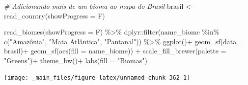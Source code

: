 \documentclass[
  brazilian,
]{book}
\newenvironment{Shaded}{\begin{snugshade}}{\end{snugshade}}
\newcommand{\AttributeTok}[1]{\textcolor[rgb]{0.77,0.63,0.00}{#1}}
\newcommand{\CommentTok}[1]{\textcolor[rgb]{0.56,0.35,0.01}{\textit{#1}}}
\newcommand{\FunctionTok}[1]{\textcolor[rgb]{0.00,0.00,0.00}{#1}}
\newcommand{\NormalTok}[1]{#1}
\newcommand{\OtherTok}[1]{\textcolor[rgb]{0.56,0.35,0.01}{#1}}
\newcommand{\SpecialCharTok}[1]{\textcolor[rgb]{0.00,0.00,0.00}{#1}}
\newcommand{\StringTok}[1]{\textcolor[rgb]{0.31,0.60,0.02}{#1}}
\begin{document}
\begin{Shaded}
\begin{Highlighting}[]
\CommentTok{\# Adicionando mais de um bioma ao mapa do Brasil}
\NormalTok{brasil }\OtherTok{\textless{}{-}} \FunctionTok{read\_country}\NormalTok{(}\AttributeTok{showProgress =}\NormalTok{ F)}

\FunctionTok{read\_biomes}\NormalTok{(}\AttributeTok{showProgress =}\NormalTok{ F) }\SpecialCharTok{\%\textgreater{}\%} 
\NormalTok{  dplyr}\SpecialCharTok{::}\FunctionTok{filter}\NormalTok{(name\_biome }\SpecialCharTok{\%in\%} \FunctionTok{c}\NormalTok{(}\StringTok{"Amazônia"}\NormalTok{, }\StringTok{"Mata Atlântica"}\NormalTok{, }\StringTok{"Pantanal"}\NormalTok{)) }\SpecialCharTok{\%\textgreater{}\%}
  \FunctionTok{ggplot}\NormalTok{()}\SpecialCharTok{+}
  \FunctionTok{geom\_sf}\NormalTok{(}\AttributeTok{data =}\NormalTok{ brasil)}\SpecialCharTok{+}
  \FunctionTok{geom\_sf}\NormalTok{(}\FunctionTok{aes}\NormalTok{(}\AttributeTok{fill =}\NormalTok{ name\_biome)) }\SpecialCharTok{+}
  \FunctionTok{scale\_fill\_brewer}\NormalTok{(}\AttributeTok{palette =} \StringTok{"Greens"}\NormalTok{)}\SpecialCharTok{+}
  \FunctionTok{theme\_bw}\NormalTok{()}\SpecialCharTok{+}
  \FunctionTok{labs}\NormalTok{(}\AttributeTok{fill =} \StringTok{"Biomas"}\NormalTok{)}
\end{Highlighting}
\end{Shaded}

\begin{center}\texttt{[image: \_main\_files/figure-latex/unnamed-chunk-362-1]} \end{center}
\end{document}
